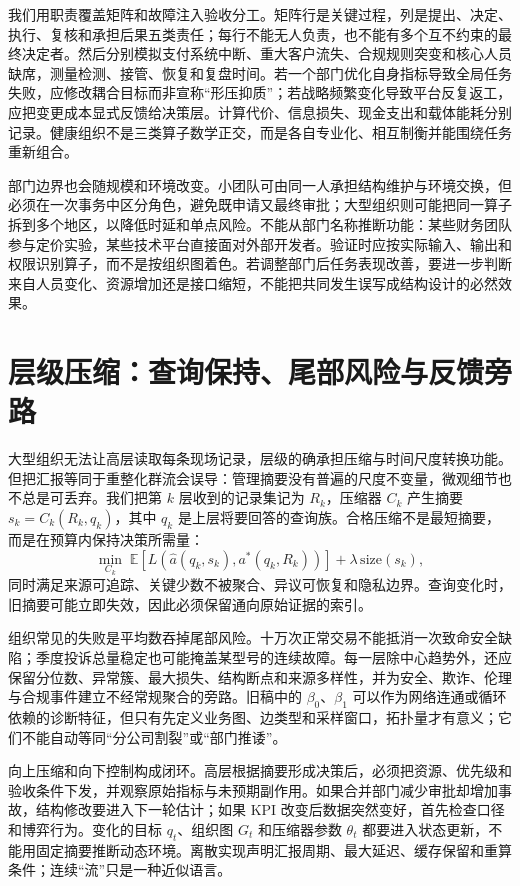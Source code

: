 我们用职责覆盖矩阵和故障注入验收分工。矩阵行是关键过程，列是提出、决定、执行、复核和承担后果五类责任；每行不能无人负责，也不能有多个互不约束的最终决定者。然后分别模拟支付系统中断、重大客户流失、合规规则突变和核心人员缺席，测量检测、接管、恢复和复盘时间。若一个部门优化自身指标导致全局任务失败，应修改耦合目标而非宣称“形压抑质”；若战略频繁变化导致平台反复返工，应把变更成本显式反馈给决策层。计算代价、信息损失、现金支出和载体能耗分别记录。健康组织不是三类算子数学正交，而是各自专业化、相互制衡并能围绕任务重新组合。

部门边界也会随规模和环境改变。小团队可由同一人承担结构维护与环境交换，但必须在一次事务中区分角色，避免既申请又最终审批；大型组织则可能把同一算子拆到多个地区，以降低时延和单点风险。不能从部门名称推断功能：某些财务团队参与定价实验，某些技术平台直接面对外部开发者。验证时应按实际输入、输出和权限识别算子，而不是按组织图着色。若调整部门后任务表现改善，要进一步判断来自人员变化、资源增加还是接口缩短，不能把共同发生误写成结构设计的必然效果。

\section{层级压缩：查询保持、尾部风险与反馈旁路}
\label{sec:org_renormalization_evolution}

大型组织无法让高层读取每条现场记录，层级的确承担压缩与时间尺度转换功能。但把汇报等同于重整化群流会误导：管理摘要没有普遍的尺度不变量，微观细节也不总是可丢弃。我们把第 $k$ 层收到的记录集记为 $R_k$，压缩器 $C_k$ 产生摘要 $s_k=C_k(R_k,q_k)$，其中 $q_k$ 是上层将要回答的查询族。合格压缩不是最短摘要，而是在预算内保持决策所需量：
\begin{equation}
 \min_{C_k}\;\mathbb E[L(\widehat a(q_k,s_k),a^*(q_k,R_k))]+\lambda\,\mathrm{size}(s_k),
\end{equation}
同时满足来源可追踪、关键少数不被聚合、异议可恢复和隐私边界。查询变化时，旧摘要可能立即失效，因此必须保留通向原始证据的索引。

组织常见的失败是平均数吞掉尾部风险。十万次正常交易不能抵消一次致命安全缺陷；季度投诉总量稳定也可能掩盖某型号的连续故障。每一层除中心趋势外，还应保留分位数、异常簇、最大损失、结构断点和来源多样性，并为安全、欺诈、伦理与合规事件建立不经常规聚合的旁路。旧稿中的 $\beta_0$、$\beta_1$ 可以作为网络连通或循环依赖的诊断特征，但只有先定义业务图、边类型和采样窗口，拓扑量才有意义；它们不能自动等同“分公司割裂”或“部门推诿”。

向上压缩和向下控制构成闭环。高层根据摘要形成决策后，必须把资源、优先级和验收条件下发，并观察原始指标与未预期副作用。如果合并部门减少审批却增加事故，结构修改要进入下一轮估计；如果 KPI 改变后数据突然变好，首先检查口径和博弈行为。变化的目标 $q_t$、组织图 $G_t$ 和压缩器参数 $\theta_t$ 都要进入状态更新，不能用固定摘要推断动态环境。离散实现声明汇报周期、最大延迟、缓存保留和重算条件；连续“流”只是一种近似语言。

